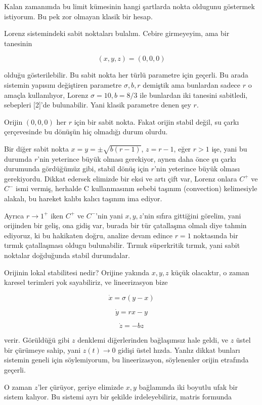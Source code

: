 \documentclass[12pt,fleqn]{article}\usepackage{../../common}
\begin{document}
Kalan zamanımda bu limit kümesinin hangi şartlarda nokta oldugunu göstermek
istiyorum. Bu pek zor olmayan klasik bir hesap. 

Lorenz sistemindeki sabit noktaları bulalım. Cebire girmeyeyim, ama bir
tanesinin

$$ (x,y,z) = (0,0,0)$$

olduğu gösterilebilir. Bu sabit nokta her türlü parametre için geçerli. Bu
arada sistemin yapısını değiştiren parametre $\sigma,b,r$ demiştik ama
bunlardan sadece $r$ o amaçla kullanılıyor, Lorenz $\sigma=10,b=8/3$ ile
bunlardan iki tanesini sabitledi, sebepleri [2]'de bulunabilir. Yani klasik
parametre denen şey $r$. 

Orijin $(0,0,0)$ her $r$ için bir sabit nokta. Fakat orijin stabil değil,
su çarkı çerçevesinde bu dönüşün hiç olmadığı durum olurdu.

Bir diğer sabit nokta $x = y = \pm \sqrt{b(r-1)}$, $z=r-1$, eğer $r > 1$
işe, yani bu durumda $r$'nin yeterince büyük olması gerekiyor, aynen daha
önce şu çarkı durumunda gördüğümüz gibi, stabil dönüş için $r$'nin
yeterince büyük olması gerekiyordu. Dikkat edersek elimizde bir eksi ve
artı çift var, Lorenz onlara $C^+$ ve $C^-$ ismi vermiş, herhalde C
kullanmasının sebebi taşınım (convection) kelimesiyle alakalı, bu hareket
kalıbı kalıcı taşınım ima ediyor.

Ayrıca $r \to 1^+$ iken $C^+$ ve $C^-$'nin yani $x,y,z$'nin sıfıra
gittiğini görelim, yani orijinden bir geliş, ona gidiş var, burada bir tür
çatallaşma olmalı diye tahmin ediyoruz, ki bu hakikaten doğru, analize
devam edince $r=1$ noktasında bir tırmık çatallaşması oldugu
bulunabilir. Tırmık süperkritik tırmık, yani sabit noktalar doğduğunda
stabil durumdalar. 

Orijinin lokal stabilitesi nedir? Orijine yakında $x,y,z$ küçük olacaktır,
o zaman karesel terimleri yok sayabiliriz, ve lineerizasyon bize

$$ \dot{x} = \sigma (y-x)  $$

$$ \dot{y} = rx - y$$

$$ \dot{z} = -bz $$

verir. Görüldüğü gibi $z$ denklemi diğerlerinden bağlaşımsız hale geldi, ve $z$
üstel bir çürümeye sahip, yani $z(t) \to 0$ gidişi üstel hızda. Yanlız
dikkat bunları sistemin geneli için söylemiyorum, bu lineerizasyon,
söylenenler orijin etrafında geçerli. 

O zaman $z$'ler çürüyor, geriye elimizde $x,y$ bağlamında iki boyutlu ufak
bir sistem kalıyor. Bu sistemi ayrı bir şekilde irdeleyebiliriz, matris
formunda 
\end{document}
